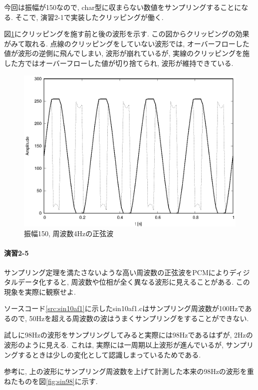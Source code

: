 \documentclass[titlepage]{jsarticle}
\begin{document}
        今回は振幅が150なので, char型に収まらない数値をサンプリングすることになる.
        そこで, 演習2-1で実装したクリッピングが働く.

        図\ref{fig:sin150f4}にクリッピングを施す前と後の波形を示す.
        この図からクリッピングの効果がみて取れる.
        点線のクリッピングをしていない波形では, オーバーフローした値が波形の逆側に飛んでしまい,
        波形が崩れているが, 実線のクリッピングを施した方ではオーバーフローした値が切り捨てられ, 波形が維持できている.
        
        \begin{figure}[ht]
            \centering
            \includegraphics[width=12cm]{images/sin150f4.eps}
            \caption{振幅150, 周波数4Hzの正弦波}
            \label{fig:sin150f4}
        \end{figure}

    \paragraph{演習2-5} サンプリング定理を満たさないような高い周波数の正弦波をPCMによりディジタルデータ化すると,
    周波数や位相が全く異なる波形に見えることがある. この現象を実際に観察せよ.

        ソースコード\ref{src:sin10af1}に示したsin10af1.cはサンプリング周波数が100Hzであるので,
        50Hzを超える周波数の波はうまくサンプリングをすることができない.

        試しに98Hzの波形をサンプリングしてみると実際には98Hzであるはずが, 2Hzの波形のように見える.
        これは, 実際には一周期以上波形が進んでいるが, サンプリングするときは少しの変化として認識しまっているためである.
        
        参考に, 上の波形にサンプリング周波数を上げて計測した本来の98Hzの波形を重ねたものを図\ref{fig:sin98}に示す.
\end{document}
